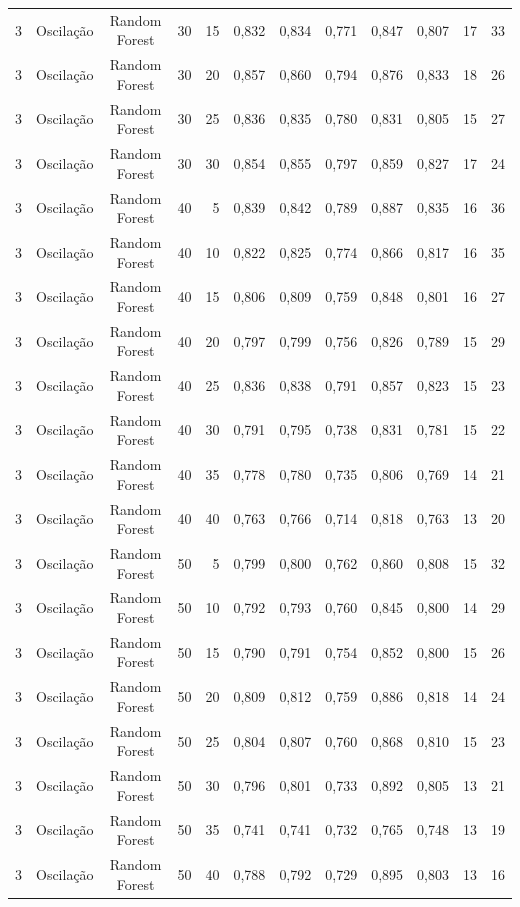 \begin{longtable}{ccclrrrrrrrr}
3 & Oscilação & Random Forest & 30 & 15 & 0,832 & 0,834 & 0,771 & 0,847 & 0,807 & 17 & 33 \\
3 & Oscilação & Random Forest & 30 & 20 & 0,857 & 0,860 & 0,794 & 0,876 & 0,833 & 18 & 26 \\
3 & Oscilação & Random Forest & 30 & 25 & 0,836 & 0,835 & 0,780 & 0,831 & 0,805 & 15 & 27 \\
3 & Oscilação & Random Forest & 30 & 30 & 0,854 & 0,855 & 0,797 & 0,859 & 0,827 & 17 & 24 \\
3 & Oscilação & Random Forest & 40 & 5 & 0,839 & 0,842 & 0,789 & 0,887 & 0,835 & 16 & 36 \\
3 & Oscilação & Random Forest & 40 & 10 & 0,822 & 0,825 & 0,774 & 0,866 & 0,817 & 16 & 35 \\
3 & Oscilação & Random Forest & 40 & 15 & 0,806 & 0,809 & 0,759 & 0,848 & 0,801 & 16 & 27 \\
3 & Oscilação & Random Forest & 40 & 20 & 0,797 & 0,799 & 0,756 & 0,826 & 0,789 & 15 & 29 \\
3 & Oscilação & Random Forest & 40 & 25 & 0,836 & 0,838 & 0,791 & 0,857 & 0,823 & 15 & 23 \\
3 & Oscilação & Random Forest & 40 & 30 & 0,791 & 0,795 & 0,738 & 0,831 & 0,781 & 15 & 22 \\
3 & Oscilação & Random Forest & 40 & 35 & 0,778 & 0,780 & 0,735 & 0,806 & 0,769 & 14 & 21 \\
3 & Oscilação & Random Forest & 40 & 40 & 0,763 & 0,766 & 0,714 & 0,818 & 0,763 & 13 & 20 \\
3 & Oscilação & Random Forest & 50 & 5 & 0,799 & 0,800 & 0,762 & 0,860 & 0,808 & 15 & 32 \\
3 & Oscilação & Random Forest & 50 & 10 & 0,792 & 0,793 & 0,760 & 0,845 & 0,800 & 14 & 29 \\
3 & Oscilação & Random Forest & 50 & 15 & 0,790 & 0,791 & 0,754 & 0,852 & 0,800 & 15 & 26 \\
3 & Oscilação & Random Forest & 50 & 20 & 0,809 & 0,812 & 0,759 & 0,886 & 0,818 & 14 & 24 \\
3 & Oscilação & Random Forest & 50 & 25 & 0,804 & 0,807 & 0,760 & 0,868 & 0,810 & 15 & 23 \\
3 & Oscilação & Random Forest & 50 & 30 & 0,796 & 0,801 & 0,733 & 0,892 & 0,805 & 13 & 21 \\
3 & Oscilação & Random Forest & 50 & 35 & 0,741 & 0,741 & 0,732 & 0,765 & 0,748 & 13 & 19 \\
3 & Oscilação & Random Forest & 50 & 40 & 0,788 & 0,792 & 0,729 & 0,895 & 0,803 & 13 & 16 \\

\end{longtable}
